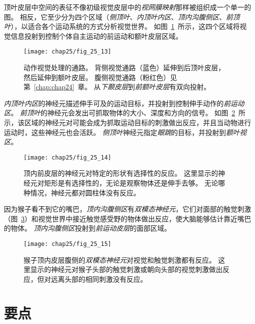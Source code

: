 顶叶皮层中空间的表征不像初级视觉皮层中的\textit{视网膜映射}那样被组织成一个单一的图。
相反，它至少分为四个区域（\textit{侧顶叶}、\textit{内顶叶内区}、\textit{顶内沟腹侧区}、\textit{前顶叶}），以适合各个运动系统的方式分析视觉世界。
如图~\ref{fig:25_13}~所示，这四个区域将视觉信息投射到控制个体自主运动的前运动和额叶皮层区域。


\begin{figure}[htbp]
	\centering
	\texttt{[image: chap25/fig\_25\_13]}
	\caption{动作视觉处理的通路。
		背侧视觉通路（蓝色）延伸到后顶叶皮层，然后延伸到额叶皮层。
		腹侧视觉通路（粉红色）见第~\ref{chap:chap24}~章。
		从\textit{下颞皮层}到\textit{前额叶皮层}有双向投射。}
	\label{fig:25_13}
\end{figure}


\textit{内顶叶内区}的神经元描述伸手可及的运动目标，并投射到控制伸手动作的\textit{前运动区}。
\textit{前顶叶}的神经元会发出可抓取物体的大小、深度和方向的信号。
如图~\ref{fig:25_14}~所示，该区域的神经元对可能会成为抓取运动目标的刺激做出反应，并且当动物进行运动时，这些神经元也会活跃。
\textit{侧顶叶}神经元指定\textit{眼跳}的目标，并投射到\textit{额叶视区}。


\begin{figure}[htbp]
	\centering
	\texttt{[image: chap25/fig\_25\_14]}
	\caption{顶内前皮层的神经元对特定的形状有选择性的反应。
		这里显示的神经元对矩形是有选择性的，无论是观察物体还是伸手去够。
		无论哪种情况，神经元都对圆柱体没有反应。}
	\label{fig:25_14}
\end{figure}


因为猴子看不到它的嘴巴，\textit{顶内沟腹侧区}有\textit{双模态神经元}，它们对面部的触觉刺激（图~\ref{fig:25_15}）和视觉世界中接近触觉感受野的物体做出反应，使大脑能够估计靠近嘴巴的物体。
\textit{顶内沟腹侧区}投射到\textit{前运动皮层}的面部区域。


\begin{figure}[htbp]
	\centering
	\texttt{[image: chap25/fig\_25\_15]}
	\caption{猴子顶内皮层腹侧的\textit{双模态神经元}对视觉和触觉刺激都有反应。
		这里显示的神经元对猴子头部的触觉刺激或朝向头部的视觉刺激做出反应，但对远离头部的相同刺激没有反应。}
	\label{fig:25_15}
\end{figure}



\section{要点}

